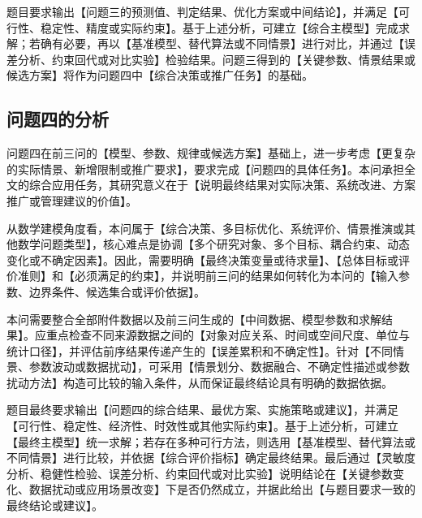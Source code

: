 题目要求输出【问题三的预测值、判定结果、优化方案或中间结论】，并满足【可行性、稳定性、精度或实际约束】。基于上述分析，可建立【综合主模型】完成求解；若确有必要，再以【基准模型、替代算法或不同情景】进行对比，并通过【误差分析、约束回代或对比实验】检验结果。问题三得到的【关键参数、情景结果或候选方案】将作为问题四中【综合决策或推广任务】的基础。

\subsection{问题四的分析}

问题四在前三问的【模型、参数、规律或候选方案】基础上，进一步考虑【更复杂的实际情景、新增限制或推广要求】，要求完成【问题四的具体任务】。本问承担全文的综合应用任务，其研究意义在于【说明最终结果对实际决策、系统改进、方案推广或管理建议的价值】。

从数学建模角度看，本问属于【综合决策、多目标优化、系统评价、情景推演或其他数学问题类型】，核心难点是协调【多个研究对象、多个目标、耦合约束、动态变化或不确定因素】。因此，需要明确【最终决策变量或待求量】、【总体目标或评价准则】和【必须满足的约束】，并说明前三问的结果如何转化为本问的【输入参数、边界条件、候选集合或评价依据】。

本问需要整合全部附件数据以及前三问生成的【中间数据、模型参数和求解结果】。应重点检查不同来源数据之间的【对象对应关系、时间或空间尺度、单位与统计口径】，并评估前序结果传递产生的【误差累积和不确定性】。针对【不同情景、参数波动或数据扰动】，可采用【情景划分、数据融合、不确定性描述或参数扰动方法】构造可比较的输入条件，从而保证最终结论具有明确的数据依据。

题目最终要求输出【问题四的综合结果、最优方案、实施策略或建议】，并满足【可行性、稳定性、经济性、时效性或其他实际约束】。基于上述分析，可建立【最终主模型】统一求解；若存在多种可行方法，则选用【基准模型、替代算法或不同情景】进行比较，并依据【综合评价指标】确定最终结果。最后通过【灵敏度分析、稳健性检验、误差分析、约束回代或对比实验】说明结论在【关键参数变化、数据扰动或应用场景改变】下是否仍然成立，并据此给出【与题目要求一致的最终结论或建议】。
